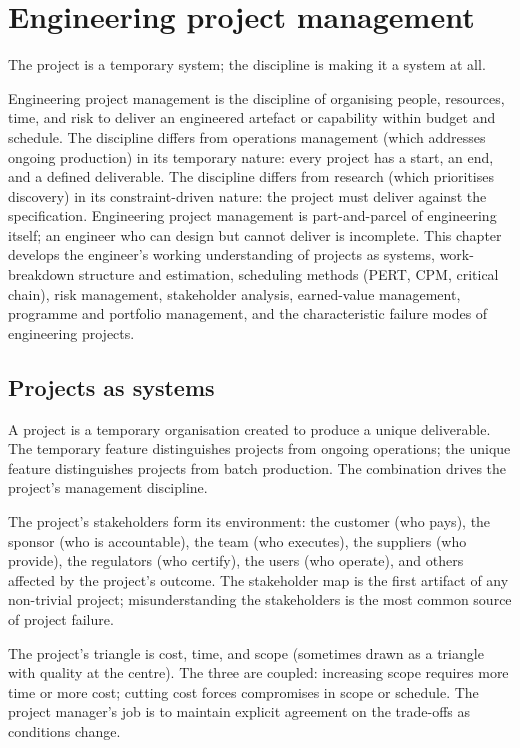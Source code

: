 \chapter{Engineering project management}
\label{vol09:ch10}

\epigraph{The project is a temporary system; the discipline is making it a system at all.}{}


\noindent
Engineering project management is the discipline of organising people, resources, time, and risk to deliver an engineered artefact or capability within budget and schedule. The discipline differs from operations management (which addresses ongoing production) in its temporary nature: every project has a start, an end, and a defined deliverable. The discipline differs from research (which prioritises discovery) in its constraint-driven nature: the project must deliver against the specification. Engineering project management is part-and-parcel of engineering itself; an engineer who can design but cannot deliver is incomplete. This chapter develops the engineer's working understanding of projects as systems, work-breakdown structure and estimation, scheduling methods (PERT, CPM, critical chain), risk management, stakeholder analysis, earned-value management, programme and portfolio management, and the characteristic failure modes of engineering projects.

\section{Projects as systems}

A project is a temporary organisation created to produce a unique deliverable. The temporary feature distinguishes projects from ongoing operations; the unique feature distinguishes projects from batch production. The combination drives the project's management discipline.

The project's stakeholders form its environment: the customer (who pays), the sponsor (who is accountable), the team (who executes), the suppliers (who provide), the regulators (who certify), the users (who operate), and others affected by the project's outcome. The stakeholder map is the first artifact of any non-trivial project; misunderstanding the stakeholders is the most common source of project failure.

The project's triangle is cost, time, and scope (sometimes drawn as a triangle with quality at the centre). The three are coupled: increasing scope requires more time or more cost; cutting cost forces compromises in scope or schedule. The project manager's job is to maintain explicit agreement on the trade-offs as conditions change.


